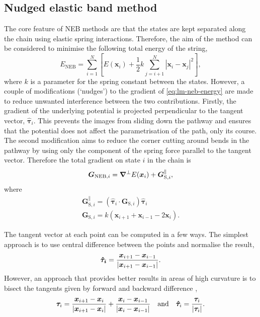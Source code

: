 \subsection{Nudged elastic band method}\label{sec:lm-neb}
The core feature of NEB methods \cite{Henkelman2000,Trygubenko2004} are that the states are kept separated along the chain using elastic spring interactions.
Therefore, the aim of the method can be considered to minimise the following total energy of the string,
\begin{equation}
  E_\text{NEB} = \sum_{i=1}^N \left[ E(\bm{x}_i) + \frac{1}{2} k \sum_{j=i+1}^N |\bm{x}_i - \bm{x}_j|^2 \right],
  \label{eq:lm-neb-energy}
\end{equation}
where $k$ is a parameter for the spring constant between the states.
However, a couple of modifications (`nudges') to the gradient of \cref{eq:lm-neb-energy} are made to reduce unwanted interference between the two contributions.
Firstly, the gradient of the underlying potential is projected perpendicular to the tangent vector, $\bm{\hat{\tau}}_i$.
This prevents the images from sliding down the pathway and ensures that the potential does not affect the parametrisation of the path, only its course.
The second modification aims to reduce the corner cutting around bends in the pathway by using only the component of the spring force parallel to the tangent vector.
Therefore the total gradient on state $i$ in the chain is
\begin{equation}
  \bm{G}_{\text{NEB},i} = \bm{\nabla}^\perp E(\bm{x}_i) + \bm{G}_{\text{S},i}^\parallel,
  \label{eq:lm-neb-gradient}
\end{equation}
where
\begin{gather}
  \bm{G}_{\text{S},i}^\parallel = (\bm{\hat{\tau}}_i \cdot \bm{G}_{\text{S},i}) \bm{\hat{\tau}}_i\\
  \bm{G}_{\text{S},i} = k (\bm{x}_{i+1} + \bm{x}_{i-1} - 2\bm{x}_i).
\end{gather}

The tangent vector at each point can be computed in a few ways.
The simplest approach is to use central difference between the points and normalise the result,
\begin{equation}
  \bm{\hat{\tau}_i} = \frac{\bm{x}_{i+1} - \bm{x}_{i-1}} {\left| \bm{x}_{i+1} - \bm{x}_{i-1} \right|}.
\end{equation}
However, an approach that provides better results in areas of high curvature is to bisect the tangents given by forward and backward difference \cite{Henkelman2000},
\begin{equation}
  \bm{\tau}_i = \frac{\bm{x}_{i+1} - \bm{x}_{i}} {\left| \bm{x}_{i+1} - \bm{x}_{i} \right|} +
                \frac{\bm{x}_{i} - \bm{x}_{i-1}} {\left| \bm{x}_{i} - \bm{x}_{i-1} \right|}
  \quad\text{and}\quad
  \bm{\hat{\tau}}_i = \frac{\bm{\tau}_i}{\left| \bm{\tau}_i \right|}.
  \label{eq:lm-neb-taubisect}
\end{equation}

